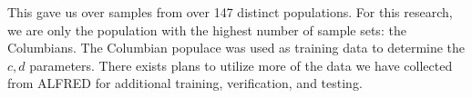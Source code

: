 This gave us over samples from over 147 distinct populations.
For this research, we are only the population with the highest number of sample sets: the Columbians.
The Columbian populace was used as training data to determine the $c, d$ parameters.
There exists plans to utilize more of the data we have collected from ALFRED for additional training, verification,
and testing.
